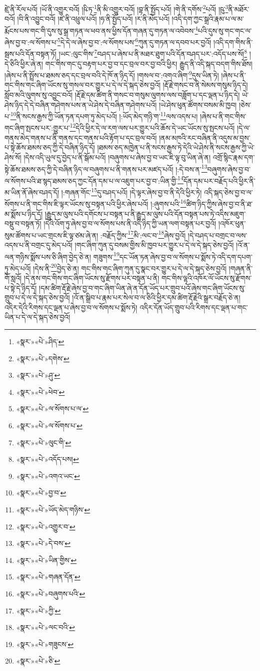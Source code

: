 ཛྲེ་ནི་རོལ་པའོ། །ཡོ་ནི་འགྱུར་བའོ། །ཥི་ཏ་\footnote{«སྣར་»«པེ་»ཤིད་}ནི་མི་འགྱུར་བའོ། །བྷ་ནི་སྤྱོད་པའོ། །གེ་ནི་དགོས་\footnote{«སྣར་»«པེ་»དགེས་}པའོ། །ཥུ་\footnote{«སྣར་»«པེ་»ཤུ་}ནི་མཐོར་བའོ། །བི་ནི་འབྱུང་བའོ། །ཛ་ནི་འཕྲུལ་པའོ། །ཧ་ནི་སྤྱོད་པའོ། །ར་ནི་མེད་པའོ། །འདི་དག་ཀྱང་སྒྲའི་རྣམ་པ་ལ་མ་རྨོངས་པས་གང་གི་དུས་སུ་སྒྲ་གཏན་ལ་ཕབ་ནས་ཕྱིས་དོན་གཞན་དུ་གཏན་ལ་འབེབས་\footnote{«སྣར་»«པེ་»ཕེབ་}པའི་དུས་སུ་གང་གང་ལ་ཞེས་བྱ་བ་:ལ་སོགས་པ་\footnote{«སྣར་»«པེ་»ལ་སོགས་པ་ལ་}དེ་དེ་ལ་ཞེས་བྱ་བ་:ལ་སོགས་པས་\footnote{«སྣར་»«པེ་»ལ་སོགས་པ་}ཀུན་དུ་གཏན་ལ་དབབ་པར་བྱའོ། །འདི་དག་གིས་ནི་སྦས་པའི་དོན་བསྟན་ཏོ། །ཡང་:ལུང་གིས་\footnote{«སྣར་»«པེ་»ལུང་གི་}བཤད་པ་ཞེས་པ་ནི་མཐར་ཐུག་པའི་དོན་བཤད་པར་:འདོད་པས་སོ།\footnote{«སྣར་»«པེ་»འདོད་པས།} །དེ་ཅིའི་ཕྱིར་ཞེ་ན། གང་གིས་གང་དུ་བརྟག་པར་བྱ་བ་དང་བྲལ་བར་བྱ་བའི་ཕྱིར། རྒྱུད་ནི་འདི་སྐད་བདག་གིས་ཐོས། །ཞེས་པ་ནི་སྤྲོས་པ་ཐམས་ཅད་དང་བྲལ་བའི་དེ་ཁོ་ན་ཉིད་དོ། །གསལ་བ་:འགའ་ཞིག་\footnote{«སྣར་»«པེ་»འགའ་ཡང་}དུས་ཡིན་ཏེ། །ཞེས་པ་ནི་གང་གིས་གང་ཞིག་ཡོངས་སུ་གསལ་བར་གྱུར་པ་དེ་ལ་དེ་སྐད་ཅེས་བྱའོ། །རྡོ་རྗེ་གསང་བ་ནི་སེམས་གསུམ་ཉིད་དེ། སློབ་མའི་ལུགས་སུ་འབྱུང་བའོ། །རྡོ་རྗེ་དམ་ཚིག་ནི་གསང་བ་གསུམ་ལུགས་ལས་བཟློག་པ་དང་ལྡན་པ་ཉིད་དེ། ཡེ་ཤེས་ཉིད་དེ་དེ་བཞིན་གཤེགས་པས་ན་ཡེ་ཤེས་དེ་བཞིན་གཤེགས་པའོ། །ཡེ་ཤེས་ཕུན་ཚོགས་བསམ་མི་ཁྱབ། །ཅེས་པ་\footnote{«སྣར་»«པེ་»བྱ་བ་}ནི་སངས་རྒྱས་ཀྱི་ཡོན་ཏན་དཔག་ཏུ་མེད་པའོ། །:ཡོད་མེད་གཉི་ག་\footnote{«སྣར་»«པེ་»ཡོད་མེད་གཉིས་}ལས་འདས་པ། །ཞེས་པ་ནི་གང་གིས་གང་ཞིག་སྤངས་པར་:གྱུར་པ་\footnote{«སྣར་»«པེ་»འགྱུར་བ་}དེའི་ཕྱིར་དེ་ལ་རག་ལས་པར་གྱུར་པའི་ཆོས་དེ་ཡང་ཡོངས་སུ་སྤངས་པའོ། །དེ་ལ་གནས་མེད་གནས་པ་ནི་གནས་དང་གནས་པའི་རྟོག་པ་དང་བྲལ་བའོ། །ནམ་མཁའི་རང་བཞིན་ནི་འདུས་མ་བྱས་པ་སྟེ་ཆོས་ཐམས་ཅད་ཀྱི་དེ་བཞིན་ཉིད་དོ། །ཐམས་ཅད་མཁྱེན་པ་ནི་སངས་རྒྱས་ཏེ་དེའི་ཡེ་ཤེས་ནི་སངས་རྒྱས་ཀྱི་ཡེ་ཤེས་སོ། །དེས་འདི་ཡུལ་དུ་བྱེད་པ་ནི་སྒོམ་པའོ། །བཞུགས་པ་ཞེས་བྱ་བ་ཡང་ཇི་ལྟ་བུ་ཡིན་ཞེ་ན། འགྲོ་སྙིང་རྣམ་དག་སྟེ་ཆོས་ཐམས་ཅད་ཀྱི་དེ་བཞིན་ཉིད་ལ་བཞུགས་པ་ནི་གནས་པར་མཛད་པའོ། །:དེ་བས་ན་\footnote{«སྣར་»«པེ་»དེ་བས་}བཞུགས་ཞེས་བྱ་བ་ལ་སོགས་པའི་ཐ་སྙད་ཐམས་ཅད་ཀྱང་དོན་དམ་པ་ལ་འཇུག་པར་བྱ་བ་:ཡིན་གྱི་\footnote{«སྣར་»«པེ་»ཡིན་གྱིས་}དོན་དམ་པར་བརྗོད་པའི་ཕྱིར་ནི་མ་ཡིན་ནོ་ཞེས་བཤད་དོ། །:གཞན་གོང་\footnote{«སྣར་»«པེ་»གཞན་དོན་}དུ་བཤད་པའོ། །དེ་ལྟར་ཞེས་བྱ་བ་ནི་དེའི་ཕྱིར་ཏེ། འདི་སྐད་ཅེས་བྱ་བ་ལ་སོགས་པ་ནི་གང་གིས་ཇི་ལྟར་ཡོངས་སུ་བསྟན་པའི་ཕྱིར་ཞེས་པའོ། །:ཞུགས་པའི་\footnote{«སྣར་»«པེ་»བཞུགས་པའི་}ཚིག་ཉིད་ཀྱིས་ཞེས་བྱ་བ་ནི་ཐ་མ་སྨོས་པ་ཉིད་དོ། །རྒྱུད་མ་ལུས་པའི་དགོངས་པ་བསྟན་པ་ནི་རྒྱུད་མ་ལུས་པའི་དོན་བསྟན་པས་ཏེ་འདིས་མཇུག་བསྡུ་བ་བསྟན་ཏོ། །དེའི་འོག་ཏུ་ཞེས་བྱ་བ་ལ་སོགས་པས་ནི་འདི་ཉིད་ཀྱི་ཡན་ལག་བསྟན་པར་བྱའོ། །འཁོར་ཕུན་སུམ་ཚོགས་པ་ཡང་གྲངས་ཇི་ལྟ་ཙམ་ཞེ་ན། :བརྗོད་ཀྱིས་\footnote{«སྣར་»«པེ་»ཀྱི་}མི་:ལང་བ་\footnote{«སྣར་»«པེ་»ལང་བའི་}ཞེས་བྱའོ། །དེ་བཤད་པ་བགྲང་བ་ལས་འདས་པ་ནི་བགྲང་དུ་མེད་པའོ། །གང་ཞིག་ཀུན་དུ་བསམ་གྱིས་མི་ཁྱབ་པར་གྱུར་པ་དེ་ལ་དེ་སྐད་ཅེས་བྱའོ། །འོ་ན་ལན་གཉིས་སྨོས་པས་ཅི་ཞིག་བྱེད་ཅེ་ན། གཟུགས་\footnote{«སྣར་»«པེ་»གཟུངས་}དང་ཡོན་ཏན་ཞེས་བྱ་བ་ལ་སོགས་པ་སྨོས་ཏེ་འདི་དག་དཔག་ཏུ་མེད་པའོ། །དེས་ནི་\footnote{«སྣར་»«པེ་»ཅི་}བྱེད་ཅེ་ན། གང་གིས་གང་ཞིག་ཀུན་དུ་སྣང་བར་གྱུར་པ་དེ་ལ་དེ་སྐད་ཅེས་བྱའོ། །གཞན་ནི་གོ་སླའོ། །དེ་ནས་གང་གིས་གང་ཞིག་ཡོངས་སུ་རྫོགས་པར་བསྟན་པ་ནི། གང་གིས་ལྷའི་འཁོར་ལོ་ཡོངས་སུ་རྫོགས་པ་སྟེ་དེ་ཉིད་དོ། །དམ་ཚིག་རྡོ་རྗེ་ཞེས་བྱ་བ་གང་ཞིག་ཡིན་ཞེ་ན་དོན་ཡོད་པར་གྲུབ་པའོ་ཞེས་གང་ཞིག་ཡོངས་སུ་གྲུབ་པ་དེ་ལ་དེ་སྐད་ཅེས་བྱའོ། །འོ་ན་སྒྲིབ་པ་རྣམ་པར་སེལ་བ་ལ་ཅིའི་ཕྱིར་དམ་ཚིག་རྡོ་རྗེའི་སྒྲར་བརྗོད་ཅེ་ན། འདིར་དེའི་རིགས་དང་ལྡན་པ་ཞེས་བྱ་བ་ལ་སོགས་པ་སྨོས་ཏེ། འདིར་དོན་ཡོད་གྲུབ་པའི་རིགས་དང་ལྡན་པ་གང་ཡིན་པ་དེ་ལ་དེ་སྐད་ཅེས་བྱའོ། 
